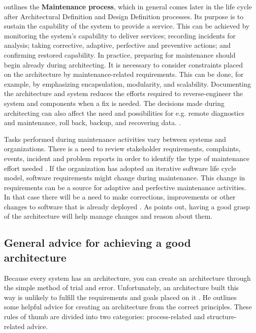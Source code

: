 \documentclass[utf8,english]{gradu3}
\begin{document}
\textcite{IEEE12207} outlines the \textbf{Maintenance process}, which in general
comes later in the life cycle after Architectural Definition and Design
Definition processes. Its purpose is to sustain the capability of the system to
provide a service. This can be achieved by monitoring the system's capability to
deliver services; recording incidents for analysis; taking corrective, adaptive,
perfective and preventive actions; and confirming restored capability. In
practice, preparing for maintenance should begin already during architecting. It
is necessary to consider constraints placed on the architecture by
maintenance-related requirements. This can be done, for example, by emphasizing
encapsulation, modularity, and scalability. Documenting the architecture and
system reduces the efforts required to reverse-engineer the system and
components when a fix is needed. The decisions made during architecting can also
affect the need and possibilities for e.g. remote diagnostics and maintenance,
roll back, backup, and recovering data. \parencite[95-96]{IEEE12207}.

Tasks performed during maintenance activities vary between systems and
organizations. There is a need to review stakeholder requirements, complaints,
events, incident and problem reports in order to identify the type of
maintenance effort needed \parencite{IEEE12207}. If the organization has adopted
an iterative software life cycle model, software requirements might change
during maintenance. This change in requirements can be a source for adaptive and
perfective maintenance activities. In that case there will be a need to make
corrections, improvements or other changes to software that is already deployed
\parencite[97]{IEEE12207}. As \textcite[32]{Bass1998} points out, having a good
grasp of the architecture will help manage changes and reason about them.


\subsection{General advice for achieving a good architecture}

Because every system has an architecture, you can create an architecture through
the simple method of trial and error. Unfortunately, an architecture built this
way is unlikely to fulfill the requirements and goals placed on it
\parencite[24]{Bass1998}. He outlines some helpful advice for creating an
architecture from the correct principles. These rules of thumb are divided into
two categories: process-related and structure-related advice.
\end{document}
